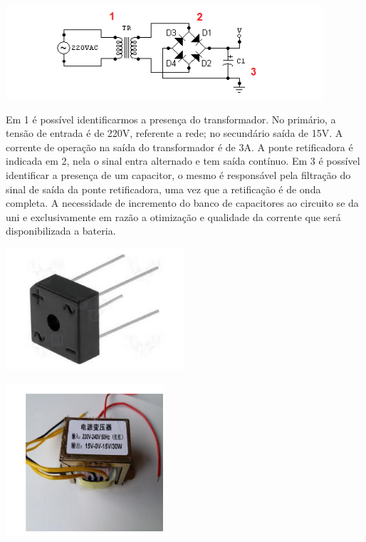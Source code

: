             
 \begin{center}
    	\includegraphics[scale=0.7]{figuras/alternada}
        \label{alternada}
    \end{center}

Em 1 é possível identificarmos a presença do transformador. No primário, a tensão de entrada é de 220V, referente a rede; no secundário saída de 15V. A corrente de operação na saída do transformador é de 3A. A ponte retificadora é indicada em 2, nela o sinal entra alternado e tem saída contínuo. Em 3 é possível identificar a presença de um capacitor, o mesmo é responsável pela filtração do sinal de saída da ponte retificadora, uma vez que a retificação é de onda completa. A necessidade de incremento do banco de capacitores ao circuito se da uni e exclusivamente em razão a otimização e qualidade da corrente que será disponibilizada a bateria. 
                                                   
                               \begin{center}
    	\includegraphics[scale=0.7]{figuras/bateria}
        \label{bateria}
    \end{center}
                                             
 \begin{center}
    	\includegraphics[scale=0.7]{figuras/trafo}
        \label{trafo}
    \end{center}
                            

